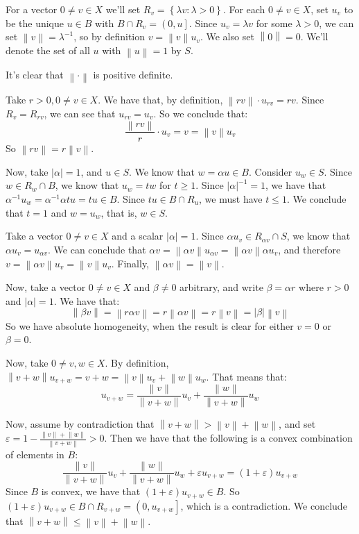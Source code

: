 \documentclass[11pt]{article} %
\newcommand{\norm}[1]{\left\lVert#1\right\rVert}
\begin{document}
\begin{Answer}
For a vector $0\neq v \in X$ we'll set $R_v = \left\{\lambda v : \lambda >0\right\}$. For each $0\neq v \in X$, set $u_v$ to be the unique $u \in B$ with $B \cap R_v = \left(0,u\right]$. Since $u_v = \lambda v$ for some $\lambda > 0$, we can set $\norm{v} =  \lambda^{-1}$, so by definition $v = \norm{v}u_v$. We also set $\norm{0} = 0$. We'll denote the set of all $u$ with $\norm{u} = 1$ by $S$.

It's clear that $\norm{\cdot}$ is positive definite.

Take $r > 0, 0\neq v\in X$. We have that, by definition, $\norm{rv}\cdot u_{rv} = rv$. Since $R_v = R_{rv}$, we can see that $u_{rv} = u_v$. So we conclude that:
\[ \frac{\norm{rv}}{r} \cdot u_v = v = \norm{v} u_v \]
So $\norm{rv}= r\norm{v}$.

Now, take $\left|\alpha\right| = 1$, and $u \in S$. We know that $w =\alpha u \in B$. Consider $u_w \in S$. Since $w \in R_w \cap B$, we know that $u_w = tw$ for $t \geq 1$. Since $\left|\alpha\right|^{-1} = 1$, we have that $\alpha^{-1}u_w = \alpha^{-1}\alpha tu = tu \in B$. Since $tu \in B\cap R_u$, we must have $t \leq 1$. We conclude that $t = 1$ and $w = u_w$, that is, $w \in S$.

Take a vector $0 \neq v \in X$ and a scalar $\left|\alpha\right| = 1$. Since $\alpha u_v \in R_{\alpha v} \cap S$, we know that $\alpha u_v = u_{\alpha v}$. We can conclude that $\alpha v = \norm{\alpha v} u_{\alpha v} = \norm{\alpha v} \alpha u_v$, and therefore $v = \norm{\alpha v} u_v = \norm{v} u_v$. Finally, $\norm{\alpha v} = \norm{v}$.

Now, take a vector $0 \neq v \in X$ and  $\beta \neq 0$ arbitrary, and write $\beta = \alpha r$ where $r >0$ and $\left|\alpha\right| = 1$. We have that:
\[ \norm{\beta v} = \norm{r\alpha v} = r\norm{\alpha v} = r\norm{v} = \left|\beta\right| \norm{v} \]
So we have absolute homogeneity, when the result is clear for either $v = 0$ or $\beta = 0$.

Now, take $0 \neq v,w \in X$. By definition, $\norm{v + w}u_{v + w} = v + w = \norm{v}u_v +\norm{w}u_w$. That means that:
\[ u_{v+w} = \frac{\norm{v}}{\norm{v + w}}u_v  + \frac{\norm{w}}{\norm{v + w}}u_w \]

Now, assume by contradiction that $\norm{v +w} > \norm{v} + \norm{w}$, and set $\varepsilon = 1 - \frac{\norm{v} + \norm{w}}{\norm{v+w}} > 0$. Then we have that the following is a convex combination of elements in $B$:
\[ \frac{\norm{v}}{\norm{v + w}}u_v + \frac{\norm{w}}{\norm{v+w}}u_w + \varepsilon u_{v+w} = \left(1+\varepsilon\right)u_{v+w}\]
Since $B$ is convex, we have that $\left(1+\varepsilon\right)u_{v+w} \in B$. So $(1+\varepsilon)u_{v+w} \in B \cap R_{v+w} = \left(0, u_{v+w}\right]$, which is a contradiction. We conclude that $\norm{v + w} \leq \norm{v} + \norm{w}$.


\end{Answer}
\end{document}

